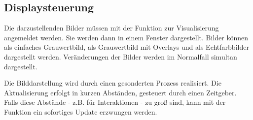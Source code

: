 
\subsection{Displaysteuerung}

Die darzustellenden Bilder müssen mit der Funktion  zur 
Visualisierung angemeldet werden. Sie werden dann in einem Fenster 
dargestellt. Bilder können als einfaches Grauwertbild, 
als Grauwertbild mit Overlays und als Echtfarbbilder dargestellt
werden. Veränderungen der Bilder werden im Normalfall simultan dargestellt.

Die Bilddarstellung wird durch einen gesonderten Prozess realisiert. Die
Aktualisierung erfolgt in kurzen Abständen, gesteuert durch einen Zeitgeber.
Falls diese Abstände - z.B. für Interaktionen - zu groß sind, kann
mit der Funktion  ein sofortiges Update erzwungen werden.

